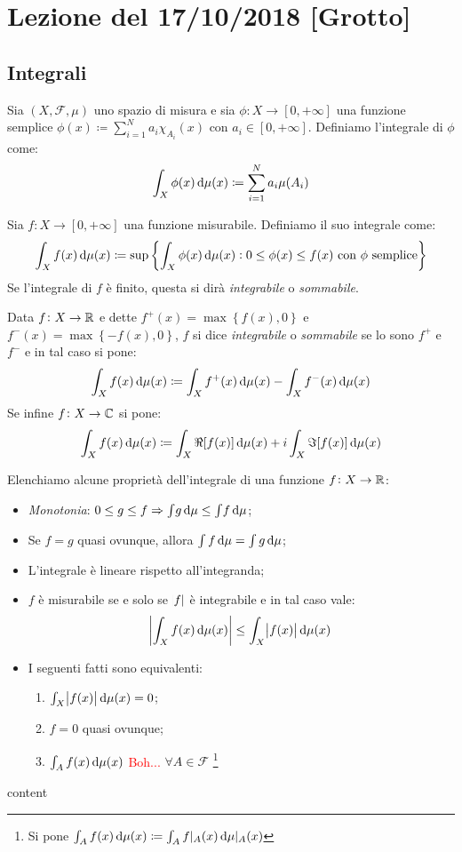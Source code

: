 \section{Lezione del 17/10/2018 [Grotto]}
\subsection{Integrali}
\begin{definition}
    Sia $ (X,\mathcal{F},\mu) $ uno spazio di misura e sia $ \phi\colon X\to [0,+\infty] $ una funzione semplice $ \phi(x) \coloneqq \sum_{i=1}^N a_i\chi_{A_i}(x)$ con $ a_i\in[0,+\infty] $. Definiamo l'integrale di $ \phi $ come:
    \[ \int_X \phi(x)\dif\mu(x) \coloneqq \sum_{i=1}^{N} a_i \mu(A_i) \]
\end{definition}
\begin{definition}
    Sia $ f\colon X\to [0,+\infty] $ una funzione misurabile. Definiamo il suo integrale come:
    \[ \int_X f(x)\dif\mu(x) \coloneqq \sup\left\{ \int_X \phi(x)\dif\mu(x) : 0 \leq \phi(x) \leq f(x) \text{ con $\phi$ semplice} \right\} \]
    Se l'integrale di $ f $ è finito, questa si dirà \emph{integrabile} o \emph{sommabile}.
\end{definition}
\begin{definition}[Integrale]
    Data $ f\colon X\to\mathbb{R} $ e dette $ f^+(x) = \max\left\{f(x),0\right\} $ e $ f^-(x) = \max\left\{-f(x), 0\right\} $, $ f $ si dice \emph{integrabile} o \emph{sommabile} se lo sono $ f^+ $ e $ f^- $ e in tal caso si pone:
    \[ \int_X f(x)\dif\mu(x) \coloneqq \int_X f^+(x)\dif\mu(x) - \int_X f^-(x)\dif\mu(x) \]
    Se infine $ f\colon X\to\mathbb{C} $ si pone:
    \[ \int_X f(x)\dif\mu(x) \coloneqq \int_X\Re[f(x)]\dif\mu(x) + i\int_X\Im[f(x)]\dif\mu(x) \]
\end{definition}
Elenchiamo alcune proprietà dell'integrale di una funzione $ f\colon X\to \mathbb{R} $:
\begin{itemize}
    \item \emph{Monotonia}: $ 0 \leq g \leq f \Rightarrow \int\! g\dif\mu \leq \int\! f\dif\mu $;
    \item Se $ f=g $ quasi ovunque, allora $ \int f\dif\mu = \int g\dif\mu $;
    \item L'integrale è lineare rispetto all'integranda;
    \item $ f $ è misurabile se e solo se $ \abs{f} $ è integrabile e in tal caso vale:
    \[ \abs{ \int_X f(x)\dif\mu(x)} \leq \int_X \abs{f(x)}\dif\mu(x) \]
    \item I seguenti fatti sono equivalenti:
    \begin{enumerate}[label=(\roman*)]
        \item $ \int_X \abs{f(x)}\dif\mu(x) = 0$;
        \item $ f = 0 $ quasi ovunque;
        \item $ \int_A f(x)\dif\mu(x) $ \textcolor{red}{Boh...} $ \forall A\in\mathcal{F} $ \footnote{Si pone $ \int_A f(x)\dif\mu(x) \coloneqq \int_A f\rvert_A(x) \dif\mu\rvert_A(x) $}
    \end{enumerate}
\end{itemize}
\begin{exercise}
    content
\end{exercise}